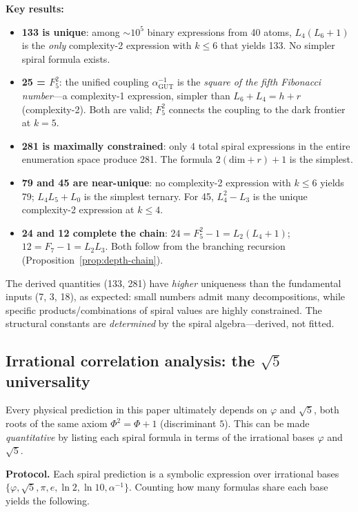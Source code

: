 \documentclass[12pt,a4paper]{article}
\begin{document}
\noindent \textbf{Key results:}
\begin{itemize}
\item \textbf{133 is unique}: among $\sim\!10^5$ binary expressions from 40 atoms, $L_4(L_6{+}1)$ is the \emph{only} complexity-2 expression with $k \leq 6$ that yields 133. No simpler spiral formula exists.
\item \textbf{25 = $F_5^2$}: the unified coupling $\alpha_{\mathrm{GUT}}^{-1}$ is the \emph{square of the fifth Fibonacci number}---a complexity-1 expression, simpler than $L_6 + L_4 = h + r$ (complexity-2). Both are valid; $F_5^2$ connects the coupling to the dark frontier at $k = 5$.
\item \textbf{281 is maximally constrained}: only 4 total spiral expressions in the entire enumeration space produce 281. The formula $2(\mathrm{dim} + r) + 1$ is the simplest.
\item \textbf{79 and 45 are near-unique}: no complexity-2 expression with $k \leq 6$ yields 79; $L_4 L_5 + L_0$ is the simplest ternary. For 45, $L_4^2 - L_3$ is the unique complexity-2 expression at $k \leq 4$.
\item \textbf{24 and 12 complete the chain}: $24 = F_5^2 - 1 = L_2(L_4{+}1)$; $12 = F_7 - 1 = L_2 L_3$. Both follow from the branching recursion (Proposition~\ref{prop:depth-chain}).
\end{itemize}

\noindent The derived quantities (133, 281) have \emph{higher} uniqueness than the fundamental inputs (7, 3, 18), as expected: small numbers admit many decompositions, while specific products/combinations of spiral values are highly constrained. The structural constants are \emph{determined} by the spiral algebra---derived, not fitted.

\subsection{Irrational correlation analysis: the $\sqrt{5}$ universality}
\label{sec:sqrt5-correlation}

Every physical prediction in this paper ultimately depends on $\varphi$ and $\sqrt{5}$, both roots of the same axiom $\Phi^2 = \Phi + 1$ (discriminant $5$). This can be made \emph{quantitative} by listing each spiral formula in terms of the irrational bases $\varphi$ and $\sqrt{5}$.

\textbf{Protocol.} Each spiral prediction is a symbolic expression over irrational bases $\{\varphi, \sqrt{5}, \pi, e, \ln 2, \ln 10, \alpha^{-1}\}$. Counting how many formulas share each base yields the following.
\end{document}

